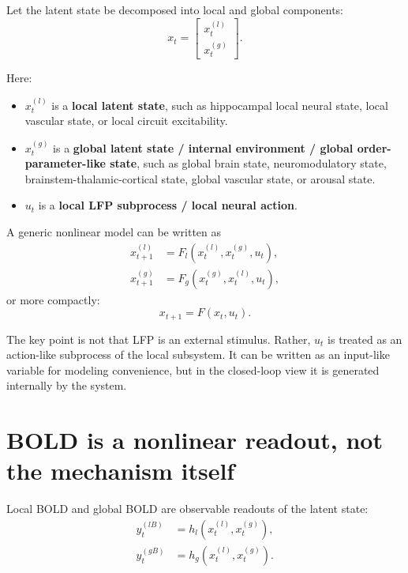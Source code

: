 \documentclass[11pt,a4paper]{article}
\begin{document}
Let the latent state be decomposed into local and global components:
\begin{equation}
    x_t =
    \begin{bmatrix}
    x_t^{(l)} \\
    x_t^{(g)}
    \end{bmatrix}.
\end{equation}

Here:
\begin{itemize}
    \item $x_t^{(l)}$ is a \textbf{local latent state}, such as hippocampal local neural state, local vascular state, or local circuit excitability.
    \item $x_t^{(g)}$ is a \textbf{global latent state / internal environment / global order-parameter-like state}, such as global brain state, neuromodulatory state, brainstem-thalamic-cortical state, global vascular state, or arousal state.
    \item $u_t$ is a \textbf{local LFP subprocess / local neural action}.
\end{itemize}

A generic nonlinear model can be written as
\begin{align}
    x_{t+1}^{(l)} &= F_l\!\left(x_t^{(l)}, x_t^{(g)}, u_t\right), \\
    x_{t+1}^{(g)} &= F_g\!\left(x_t^{(g)}, x_t^{(l)}, u_t\right),
\end{align}
or more compactly:
\begin{equation}
    x_{t+1}=F(x_t,u_t).
\end{equation}

The key point is not that LFP is an external stimulus. Rather, $u_t$ is treated as an action-like subprocess of the local subsystem. It can be written as an input-like variable for modeling convenience, but in the closed-loop view it is generated internally by the system.

\section{BOLD is a nonlinear readout, not the mechanism itself}

Local BOLD and global BOLD are observable readouts of the latent state:
\begin{align}
    y_t^{(lB)} &= h_l\!\left(x_t^{(l)}, x_t^{(g)}\right), \\
    y_t^{(gB)} &= h_g\!\left(x_t^{(l)}, x_t^{(g)}\right).
\end{align}
\end{document}
